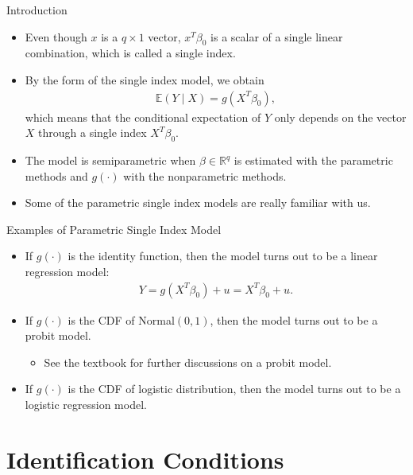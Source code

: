 \documentclass[xcolor=svgnames,dvipdfmx,cjk]{beamer}
\theoremstyle{example}
\begin{document}
\begin{frame}{Introduction}
  \begin{itemize}
    \item Even though $x$ is a $q\times1$ vector, 
          $x^{T} \beta_0$ is a scalar of a single linear combination, 
          which is called \alert{a single index}.
    \item By the form of the single index model, we obtain
          \begin{align*}
            \mathbb{E}(Y \mid X) = g(X^{T} \beta_0),
          \end{align*}
          which means that 
          the conditional expectation of $Y$ 
          only depends on the vector $X$
          through a single index $X^{T} \beta_0$.
    \item The model is semiparametric 
          when $\beta \in \mathbb{R}^{q}$ is estimated with the parametric methods
          and $g(\cdot)$ with the nonparametric methods.
    \item Some of the parametric single index models are really familiar with us.
  \end{itemize}
\end{frame}

\begin{frame}{Examples of Parametric Single Index Model}
  \begin{itemize}
    \item If $g(\cdot)$ is the identity function, 
          then the model turns out to be \alert{a linear regression model}:
          \begin{align*}
            Y = g (X^{T} \beta_0) + u = X^{T} \beta_0 + u.
          \end{align*}
    \item If $g(\cdot)$ is the CDF of Normal$(0, 1)$,
          then the model turns out to be \alert{a probit model}.
          \begin{itemize}
            \item See the textbook for further discussions on a probit model.
          \end{itemize}
    \item If $g(\cdot)$ is the CDF of logistic distribution,
          then the model turns out to be \alert{a logistic regression model}.
  \end{itemize}
  
\end{frame}


\section{Identification Conditions}
\end{document}
